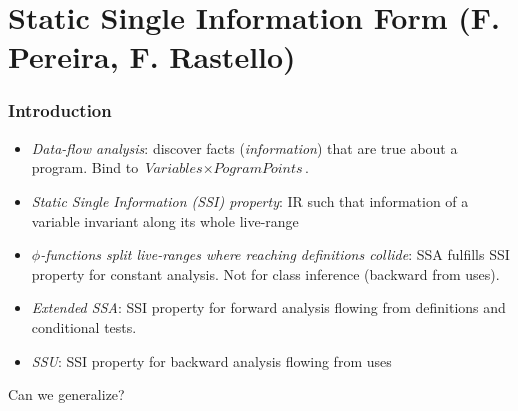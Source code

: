  


\section{Static Single Information Form (F. Pereira, F. Rastello)}
\begin{frame}
\frametitle{Introduction}
\begin{itemize}
\item \emph{Data-flow analysis}: discover facts (\emph{information}) that are true about a program. Bind to $\textit{Variables} \times \textit{PogramPoints}$.
\item \emph{Static Single Information (SSI) property}: IR such that information of a variable invariant along its whole live-range
\item \emph{$\phi$-functions split live-ranges where reaching definitions collide}: SSA fulfills SSI property for constant analysis. Not for class inference (backward from uses).
\item \emph{Extended SSA}: SSI property for forward analysis flowing from definitions and conditional tests.
\item \emph{SSU}: SSI property for backward analysis flowing from uses
\end{itemize}
\begin{minipage}{0.4\textwidth}
\begin{alertblock}{}
Can we generalize?
\end{alertblock}
\end{minipage}
\end{frame}

